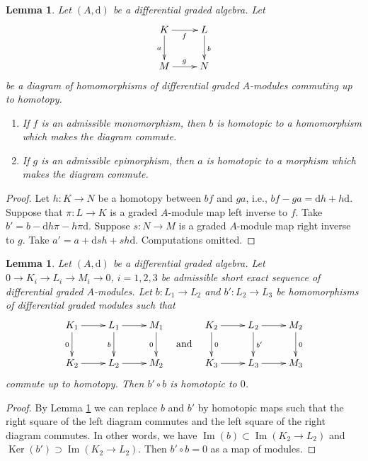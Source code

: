 \documentclass{stacks-project}
\theoremstyle{plain}
\newtheorem{lemma}[subsection]{Lemma}
\theoremstyle{definition}
\theoremstyle{remark}
\numberwithin{equation}{subsection}
\def\Ker{\mathop{\mathrm{Ker}}}
\def\Im{\mathop{\mathrm{Im}}}
\begin{document}
\begin{lemma}
\label{lemma-make-commute-map}
Let $(A, \text{d})$ be a differential graded algebra. Let
$$
\xymatrix{
K \ar[r]_f \ar[d]_a & L \ar[d]^b \\
M \ar[r]^g & N
}
$$
be a diagram of homomorphisms of differential graded $A$-modules
commuting up to homotopy.
\begin{enumerate}
\item If $f$ is an admissible monomorphism, then $b$ is homotopic to a
homomorphism which makes the diagram commute.
\item If $g$ is an admissible epimorphism, then $a$ is homotopic to a
morphism which makes the diagram commute.
\end{enumerate}
\end{lemma}

\begin{proof}
Let $h : K \to N$ be a homotopy between $bf$ and $ga$, i.e.,
$bf - ga = \text{d}h + h\text{d}$. Suppose that $\pi : L \to K$
is a graded $A$-module map left inverse to $f$. Take
$b' = b - \text{d}h\pi - h\pi \text{d}$.
Suppose $s : N \to M$ is a graded $A$-module map right inverse to $g$.
Take $a' = a + \text{d}sh + sh\text{d}$.
Computations omitted.
\end{proof}

\begin{lemma}
\label{lemma-nilpotent}
Let $(A, \text{d})$ be a differential graded algebra.
Let $0 \to K_i \to L_i \to M_i \to 0$, $i = 1, 2, 3$
be admissible short exact sequence of differential graded $A$-modules.
Let $b : L_1 \to L_2$ and $b' : L_2 \to L_3$
be homomorphisms of differential graded modules such that
$$
\vcenter{
\xymatrix{
K_1 \ar[d]_0 \ar[r] &
L_1 \ar[r] \ar[d]_b &
M_1 \ar[d]_0 \\
K_2 \ar[r] & L_2 \ar[r] & M_2
}
}
\quad\text{and}\quad
\vcenter{
\xymatrix{
K_2 \ar[d]^0 \ar[r] &
L_2 \ar[r] \ar[d]^{b'} &
M_2 \ar[d]^0 \\
K_3 \ar[r] & L_3 \ar[r] & M_3
}
}
$$
commute up to homotopy. Then $b' \circ b$ is homotopic to $0$.
\end{lemma}

\begin{proof}
By Lemma \ref{lemma-make-commute-map} we can replace $b$ and $b'$ by
homotopic maps such that the right square of the left diagram commutes
and the left square of the right diagram commutes. In other words, we have
$\Im(b) \subset \Im(K_2 \to L_2)$ and
$\Ker(b') \supset \Im(K_2 \to L_2)$.
Then $b' \circ b = 0$ as a map of modules.
\end{proof}
\end{document}
